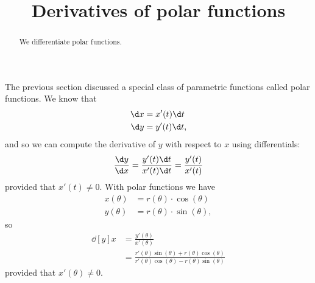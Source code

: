 \documentclass{ximera}
\title[Dig-In:]{Derivatives of polar functions}
\begin{document}
\begin{abstract}
  We differentiate polar functions.
\end{abstract}
\maketitle

The previous section discussed a special class of parametric functions
called polar functions.  We know that
\begin{align*}
  \d x &= x'(t) \d t\\
  \d y &= y'(t) \d t,
\end{align*}
and so we can compute the derivative of $y$ with respect to $x$ using
differentials:
\[
\frac{\d y}{\d x} = \frac{y'(t) \d t}{x'(t) \d t} = \frac{y'(t)}{x'(t)}
\]
provided that $x'(t) \ne 0$.  With polar functions we have
\begin{align*}
  x(\theta) &= r(\theta) \cdot \cos(\theta) \\
  y(\theta) &= r(\theta) \cdot \sin(\theta),
\end{align*}
so
\begin{align*}
\dd[y]{x} &= \frac{y'(\theta)}{x'(\theta)} \\
&= \frac{r'(\theta) \sin(\theta)+r(\theta) \cos(\theta)}{r'(\theta)\cos(\theta)-r(\theta)\sin(\theta)}
\end{align*}
provided that $x'(\theta)\ne 0$.
\end{document}
